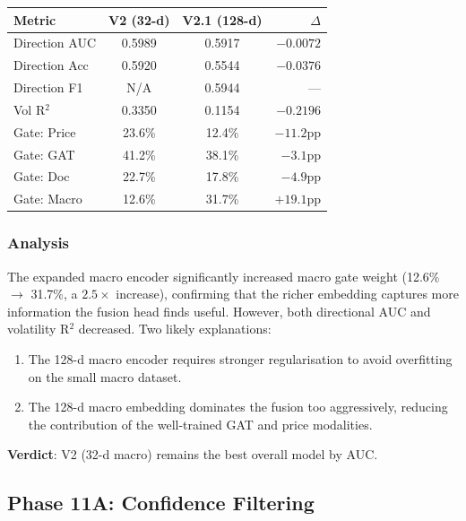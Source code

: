 \documentclass[12pt,a4paper]{article}
\begin{document}
\begin{center}
\begin{tabular}{lccr}
\hline
\textbf{Metric}   & \textbf{V2 (32-d)} & \textbf{V2.1 (128-d)} & \textbf{$\Delta$} \\
\hline
Direction AUC     & 0.5989             & 0.5917                & $-0.0072$ \\
Direction Acc     & 0.5920             & 0.5544                & $-0.0376$ \\
Direction F1      & N/A                & 0.5944                & --- \\
Vol R$^2$         & 0.3350             & 0.1154                & $-0.2196$ \\
\hline
Gate: Price       & 23.6\%             & 12.4\%                & $-11.2$pp \\
Gate: GAT         & 41.2\%             & 38.1\%                & $-3.1$pp \\
Gate: Doc         & 22.7\%             & 17.8\%                & $-4.9$pp \\
Gate: Macro       & 12.6\%             & 31.7\%                & $+19.1$pp \\
\hline
\end{tabular}
\end{center}

\subsubsection{Analysis}
The expanded macro encoder significantly increased macro gate weight
(12.6\% $\to$ 31.7\%, a $2.5\times$ increase), confirming that the
richer embedding captures more information the fusion head finds useful.
However, both directional AUC and volatility R$^2$ decreased.
Two likely explanations:
\begin{enumerate}
    \item The 128-d macro encoder requires stronger regularisation to
          avoid overfitting on the small macro dataset.
    \item The 128-d macro embedding dominates the fusion too aggressively,
          reducing the contribution of the well-trained GAT and price
          modalities.
\end{enumerate}
\textbf{Verdict}: V2 (32-d macro) remains the best overall model by AUC.

\subsection{Phase 11A: Confidence Filtering}
\end{document}
